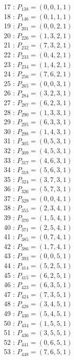 \documentclass{article}
\begin{document}
{\begin{multicols}{3}
17 : $P_{138}=( 0, 0, 1, 1 )$\\
18 : $P_{146}=( 0, 1, 1, 1 )$\\
19 : $P_{201}=( 0, 0, 2, 1 )$\\
20 : $P_{226}=( 1, 3, 2, 1 )$\\
21 : $P_{232}=( 7, 3, 2, 1 )$\\
22 : $P_{233}=( 0, 4, 2, 1 )$\\
23 : $P_{234}=( 1, 4, 2, 1 )$\\
24 : $P_{256}=( 7, 6, 2, 1 )$\\
25 : $P_{265}=( 0, 0, 3, 1 )$\\
26 : $P_{284}=( 3, 2, 3, 1 )$\\
27 : $P_{287}=( 6, 2, 3, 1 )$\\
28 : $P_{290}=( 1, 3, 3, 1 )$\\
29 : $P_{295}=( 6, 3, 3, 1 )$\\
30 : $P_{298}=( 1, 4, 3, 1 )$\\
31 : $P_{305}=( 0, 5, 3, 1 )$\\
32 : $P_{309}=( 4, 5, 3, 1 )$\\
33 : $P_{317}=( 4, 6, 3, 1 )$\\
34 : $P_{318}=( 5, 6, 3, 1 )$\\
35 : $P_{324}=( 3, 7, 3, 1 )$\\
36 : $P_{326}=( 5, 7, 3, 1 )$\\
37 : $P_{329}=( 0, 0, 4, 1 )$\\
38 : $P_{355}=( 2, 3, 4, 1 )$\\
39 : $P_{370}=( 1, 5, 4, 1 )$\\
40 : $P_{371}=( 2, 5, 4, 1 )$\\
41 : $P_{385}=( 0, 7, 4, 1 )$\\
42 : $P_{386}=( 1, 7, 4, 1 )$\\
43 : $P_{393}=( 0, 0, 5, 1 )$\\
44 : $P_{414}=( 5, 2, 5, 1 )$\\
45 : $P_{415}=( 6, 2, 5, 1 )$\\
46 : $P_{423}=( 6, 3, 5, 1 )$\\
47 : $P_{424}=( 7, 3, 5, 1 )$\\
48 : $P_{428}=( 3, 4, 5, 1 )$\\
49 : $P_{430}=( 5, 4, 5, 1 )$\\
50 : $P_{434}=( 1, 5, 5, 1 )$\\
51 : $P_{436}=( 3, 5, 5, 1 )$\\
52 : $P_{441}=( 0, 6, 5, 1 )$\\
53 : $P_{448}=( 7, 6, 5, 1 )$\\

\end{multicols}}
\end{document}
